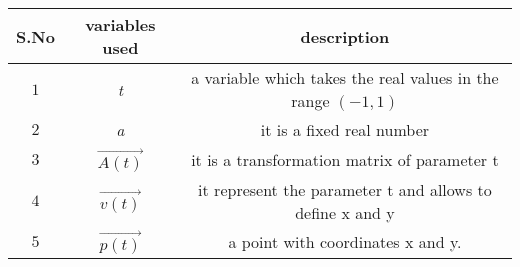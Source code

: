 \begin{tabular}[12pt]{ |c| c| c|}
    \hline
    \textbf{S.No} & \textbf{variables used}&\textbf{description}\\ 
    \hline
	$1$ & \textit{t} & a variable which takes the real values in the range $(-1,1)$\\
    \hline
	$2$ & \textit{a} & it is a fixed real number \\
    \hline
	$3$ & $\vec{A(t)}$ & it is a transformation matrix of parameter t\\
    \hline
	$4$ & $\vec{v(t)}$ & it represent the parameter t and allows to define x and y \\
    \hline
	$5$ & $\vec{p(t)}$ & a point with coordinates x and y. \\
    \hline
    \end{tabular}
